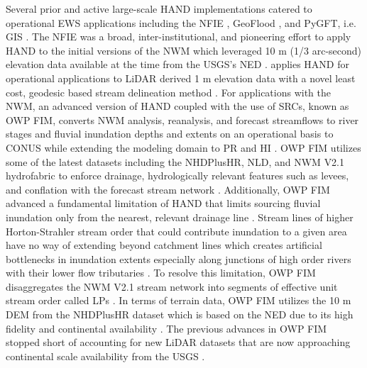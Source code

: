 \documentclass[preprint,review,12pt]{dependencies/elsarticle}
\begin{document}
Several prior and active large-scale \ac{HAND} implementations catered to operational \ac{EWS} applications including the \ac{NFIE} \citep{maidment2017conceptual,liu2016cybergis,liu2018cybergis}, GeoFlood \citep{zheng2018geoflood,hocini2021performance,d2022identification,carruthers2021assessment,zheng2022application}, and \ac{PyGFT}, i.e. \ac{GIS} \citep{petrochenkov2020pygft,verdin2016software}.
The \ac{NFIE} was a broad, inter-institutional, and pioneering effort to apply HAND to the initial versions of the \ac{NWM} which leveraged 10 \ac{m} (1/3 arc-second) elevation data available at the time \citep{maidment2017conceptual,liu2016cybergis,liu2018cybergis} from the \ac{USGS}'s \ac{NED} \citep{gesch2002national,gesch2007digital}.
\citet{zheng2018geoflood} applies HAND for operational applications to \ac{LiDAR} derived 1 \ac{m} elevation data with a novel least cost, geodesic based stream delineation method \citep{passalacqua2010geometric,passalacqua2012automatic,zheng2018geoflood,zheng2019automatic,carruthers2021assessment,d2022identification,zheng2022application}.
For applications with the \ac{NWM}, an advanced version of \ac{HAND} coupled with the use of \acp{SRC}, known as \ac{OWP} \ac{FIM}, converts \ac{NWM} analysis, reanalysis, and forecast streamflows to river stages and fluvial inundation depths and extents on an operational basis to \ac{CONUS} while extending the modeling domain to \ac{PR} and \ac{HI} \citep{aristizabal2022reducing,inundationMapping2022}.
\ac{OWP} \ac{FIM} utilizes some of the latest datasets including the \ac{NHDPlusHR}, \ac{NLD}, and \ac{NWM} \ac{V2.1} hydrofabric to enforce drainage, hydrologically relevant features such as levees, and conflation with the forecast stream network \citep{aristizabal2022reducing,inundationMapping2022}.
Additionally, \ac{OWP} \ac{FIM} advanced a fundamental limitation of \ac{HAND} that limits sourcing fluvial inundation only from the nearest, relevant drainage line \citep{mcgehee2016modified,aristizabal2022reducing,zhang2018comparative,li2022comparative,zheng2018geoflood,zheng2018river,nobre2016hand}.
Stream lines of higher Horton-Strahler stream order that could contribute inundation to a given area have no way of extending beyond catchment lines which creates artificial bottlenecks in inundation extents especially along junctions of high order rivers with their lower flow tributaries \citep{aristizabal2022reducing,mcgehee2016modified}.
To resolve this limitation, \ac{OWP} \ac{FIM} disaggregates the \ac{NWM} \ac{V2.1} stream network into segments of effective unit stream order called \acp{LP} \citep{aristizabal2022reducing}.
In terms of terrain data, \ac{OWP} \ac{FIM} utilizes the 10 \ac{m} \ac{DEM} from the \ac{NHDPlusHR} dataset which is based on the \ac{NED} due to its high fidelity and continental availability \citep{aristizabal2022reducing,moore2019user}.
The previous advances in \ac{OWP} \ac{FIM} stopped short of accounting for new \ac{LiDAR} datasets that are now approaching continental scale availability from the \ac{USGS} \citep{aristizabal2022reducing}.
\end{document}

